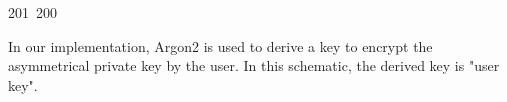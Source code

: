 201~200~\documentclass{article}
\begin{document}
	                                                                                                                                                                                                                                                                                                	                                                                                                                                        	    	                                                                                                	                                                                                                                                                                                                                                                                                                                                	                                                                        	                                                                        	                                                    In our implementation, Argon2 is used to derive a key to encrypt the asymmetrical private key by the user. In this schematic, the derived key is "user key".
\end{document}
